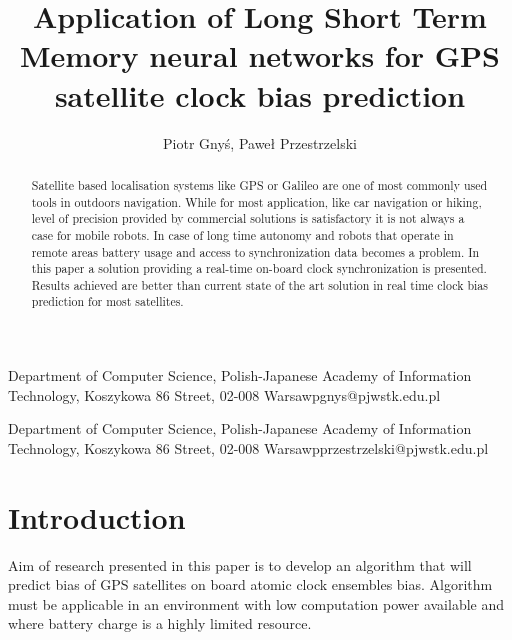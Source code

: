 \documentclass{kybernetika}
\begin{document}
\pagestyle{myheadings}
\title{Application of Long Short Term Memory neural networks for GPS satellite clock 
bias prediction}

\author{Piotr Gny\'{s}, Pawe\l{} Przestrzelski}

{Department of Computer Science,  Polish-Japanese Academy of Information Technology,
Koszykowa 86 Street, 02-008 Warsaw}{pgnys@pjwstk.edu.pl}

{Department of Computer Science,  Polish-Japanese Academy of Information Technology,
Koszykowa 86 Street, 02-008 Warsaw}{pprzestrzelski@pjwstk.edu.pl}


\maketitle

\begin{abstract}
Satellite based localisation systems like GPS or Galileo are one of most commonly used tools
in outdoors navigation. While for most application, like car navigation or hiking, level of
precision provided by commercial solutions is satisfactory it is not always a case for mobile
robots. In case of long time autonomy and robots that operate in remote areas battery usage
and access to synchronization data becomes a problem. In this paper a solution providing a 
real-time on-board clock synchronization is presented. Results achieved are better than current
state of the art solution in real time clock bias prediction for most satellites.
\end{abstract}




\section{Introduction}
Aim of research presented in this paper is to develop an algorithm that will predict bias of
GPS satellites on board atomic clock ensembles bias. Algorithm must be applicable in an 
environment with low computation power available and where battery charge is a highly limited
resource.
\end{document}
